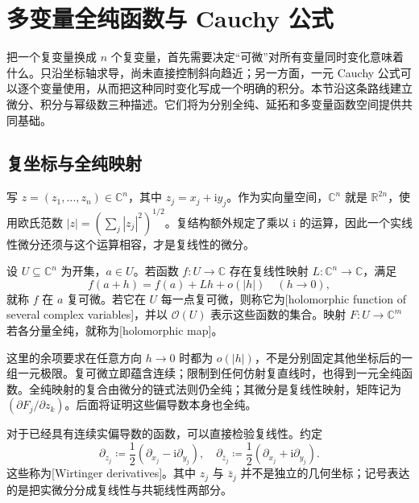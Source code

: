 \section{多变量全纯函数与 Cauchy 公式}
\label{b3:sec:2901}

把一个复变量换成 \(n\) 个复变量，首先需要决定“可微”对所有变量同时变化意味着什么。只沿坐标轴求导，尚未直接控制斜向趋近；另一方面，一元 Cauchy 公式可以逐个变量使用，从而把这种同时变化写成一个明确的积分。本节沿这条路线建立微分、积分与幂级数三种描述。它们将为分别全纯、延拓和多变量函数空间提供共同基础。

\subsection{复坐标与全纯映射}
\label{b3:subsec:290101}

写 \(z=(z_1,\ldots,z_n)\in\mathbb C^n\)，其中 \(z_j=x_j+\mathrm{i}y_j\)。作为实向量空间，\(\mathbb C^n\) 就是 \(\mathbb R^{2n}\)，使用欧氏范数 \(|z|=(\sum_j|z_j|^2)^{1/2}\)。复结构额外规定了乘以 \(\mathrm{i}\) 的运算，因此一个实线性微分还须与这个运算相容，才是复线性的微分。

\begin{definition}\label{b3:def:29-holomorphic}
设 \(U\subseteq\mathbb C^n\) 为开集，\(a\in U\)。若函数 \(f:U\to\mathbb C\) 存在复线性映射 \(L:\mathbb C^n\to\mathbb C\)，满足
\[
 f(a+h)=f(a)+Lh+o(|h|)\quad(h\to0),
\]
就称 \(f\) 在 \(a\) 复可微。若它在 \(U\) 每一点复可微，则称它为[holomorphic function of several complex variables]，并以 \(\mathcal O(U)\) 表示这些函数的集合。映射 \(F:U\to\mathbb C^m\) 若各分量全纯，就称为[holomorphic map]。
\end{definition}

这里的余项要求在任意方向 \(h\to0\) 时都为 \(o(|h|)\)，不是分别固定其他坐标后的一组一元极限。复可微立即蕴含连续；限制到任何仿射复直线时，也得到一元全纯函数。全纯映射的复合由微分的链式法则仍全纯；其微分是复线性映射，矩阵记为 \((\partial F_j/\partial z_k)\)。后面将证明这些偏导数本身也全纯。

\ProseParagraphBreak
对于已经具有连续实偏导数的函数，可以直接检验复线性。约定
\[
 \partial_{z_j}\coloneqq\frac12\left(\partial_{x_j}-\mathrm{i}\partial_{y_j}\right),
 \quad
 \partial_{\bar z_j}\coloneqq\frac12\left(\partial_{x_j}+\mathrm{i}\partial_{y_j}\right).
\]
这些称为[Wirtinger derivatives]。其中 \(z_j\) 与 \(\bar z_j\) 并不是独立的几何坐标；记号表达的是把实微分分成复线性与共轭线性两部分。

